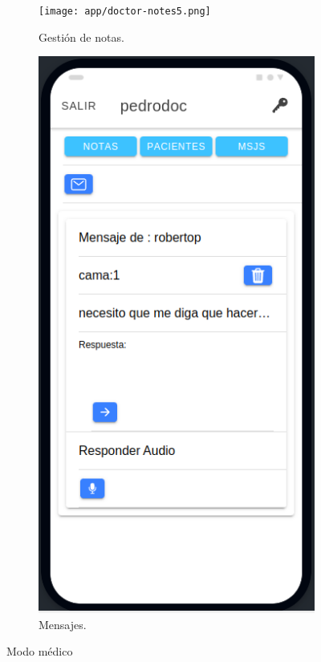 \begin{figure}[!htpb]
\begin{subfigure}[b]{0.3\textwidth}
     \end{subfigure}
     \hfill
     \begin{subfigure}[b]{0.3\textwidth}
         \centering
         \texttt{[image: app/doctor-notes5.png]}
         \caption{Gestión de notas.}
         \label{fig_1:2de3}
     \end{subfigure}
     \hfill
     \begin{subfigure}[b]{0.3\textwidth}
         \centering
         \includegraphics[width=.95\textwidth]{./Figures/app/doctor-message-audio.png}
         \caption{Mensajes.}
         \label{fig_1:3de3}
     \end{subfigure}
        \caption{Modo médico}
        \label{fig:three graphs}
\end{figure}

